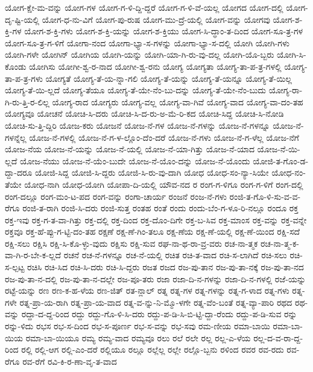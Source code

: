 {ಯೋಗ-ಕ್ಷೇ-ಮ-ವನ್ನು
ಯೋಗ-ಗಳ
ಯೋಗ-ಗ-ಳಿ-ದ್ದಿ-ದ್ದರೆ
ಯೋಗ-ಗ-ಳಿ-ವೆ-ಯಲ್ಲ
ಯೋಗದ
ಯೋಗ-ದಲ್ಲಿ
ಯೋಗ-ದೃ-ಷ್ಟಿ-ಯಲ್ಲಿ
ಯೋಗ-ಧ-ನು-ವಿಗೆ
ಯೋಗ-ಪು-ರುಷ
ಯೋಗ-ಮು-ದ್ರೆ-ಯಲ್ಲಿ
ಯೋಗ-ವನ್ನು
ಯೋಗವು
ಯೋಗ-ಶ-ಕ್ತಿ-ಗಳ
ಯೋಗ-ಶ-ಕ್ತಿ-ಗಳು
ಯೋಗ-ಶ-ಕ್ತಿ-ಯನ್ನು
ಯೋಗ-ಶ-ಕ್ತಿಯು
ಯೋಗ-ಸಿ-ದ್ಧಾಂ-ತ-ದಿಂದ
ಯೋಗ-ಸೂ-ತ್ರ-ಗಳ
ಯೋಗ-ಸೂ-ತ್ರ-ಗ-ಳಿಗೆ
ಯೋಗಾ-ನಂದ
ಯೋಗಾ-ಭ್ಯಾ-ಸ-ಗಳನ್ನು
ಯೋಗಾ-ಭ್ಯಾ-ಸ-ದಲ್ಲಿ
ಯೋಗಿ
ಯೋಗಿ-ಗಳು
ಯೋಗಿ-ಗಳೇ
ಯೋಗಿನ್
ಯೋಗಿಯ
ಯೋಗಿ-ಯನ್ನು
ಯೋಗಿ-ಯಾ-ಗಿ-ರು-ವು-ದಲ್ಲ
ಯೋಗಿ-ಯೊ-ಬ್ಬರು
ಯೋಗಿ-ಸಿ-ಕೊಂಡು
ಯೋಗಿಸು
ಯೋಗೀ-ಶ್ವ-ರ-ನಾದ
ಯೋಗೀ-ಶ್ವ-ರನು
ಯೋಗ್ಯ
ಯೋಗ್ಯತಾ
ಯೋಗ್ಯ-ತಾ-ಪ-ತ್ರ-ಗಳಲ್ಲಿ
ಯೋಗ್ಯ-ತಾ-ಪ-ತ್ರ-ಗಳು
ಯೋಗ್ಯತೆ
ಯೋಗ್ಯ-ತೆ-ಯ-ನ್ನಾ-ಗಲಿ
ಯೋಗ್ಯ-ತೆ-ಯನ್ನು
ಯೋಗ್ಯ-ತೆ-ಯನ್ನೂ
ಯೋಗ್ಯ-ತೆ-ಯಿಲ್ಲ
ಯೋಗ್ಯ-ತೆ-ಯಿ-ಲ್ಲದೆ
ಯೋಗ್ಯ-ತೆಯೂ
ಯೋಗ್ಯ-ತೆ-ಯೇ-ನೆಂ-ಬು-ದನ್ನು
ಯೋಗ್ಯ-ತೆ-ಯೇ-ನೆಂ-ಬುದು
ಯೋಗ್ಯ-ರಾ-ಗಿ-ರು-ತ್ತಿ-ರ-ಲಿಲ್ಲ
ಯೋಗ್ಯ-ರಾದ
ಯೋಗ್ಯರು
ಯೋಗ್ಯ-ವಲ್ಲ
ಯೋಗ್ಯ-ವಾ-ಗಿವೆ
ಯೋಗ್ಯ-ವಾದ
ಯೋಗ್ಯ-ವಾ-ದಂ-ತಹ
ಯೋಗ್ಯವೂ
ಯೋಚನೆ
ಯೋಚಿ-ಸಿ-ದರು
ಯೋಚಿ-ಸಿ-ದ-ರು-ಅ-ಮೆ-ರಿ-ಕದ
ಯೋಚಿ-ಸಿದ್ದ
ಯೋಚಿ-ಸಿ-ನೋಡಿ
ಯೋಚಿ-ಸು-ತ್ತಿ-ದ್ದಿರಿ
ಯೋಜ-ಕರು
ಯೋಜನೆ
ಯೋಜ-ನೆ-ಗಳ
ಯೋಜ-ನೆ-ಗಳನ್ನು
ಯೋಜ-ನೆ-ಗಳನ್ನೂ
ಯೋಜ-ನೆ-ಗಳನ್ನೆಲ್ಲ
ಯೋಜ-ನೆ-ಗಳಲ್ಲಿ
ಯೋಜ-ನೆ-ಗ-ಳ-ಲ್ಲೊಂ-ದೆಂ-ದರೆ
ಯೋಜ-ನೆ-ಗಳು
ಯೋಜ-ನೆ-ಗ-ಳೆಲ್ಲ
ಯೋಜ-ನೆಗೆ
ಯೋಜ-ನೆಯ
ಯೋಜ-ನೆ-ಯನ್ನು
ಯೋಜ-ನೆ-ಯಲ್ಲಿ
ಯೋಜ-ನೆ-ಯಾ-ಗಿತ್ತು
ಯೋಜ-ನೆ-ಯಾದ
ಯೋಜ-ನೆ-ಯಿ-ಲ್ಲದೆ
ಯೋಜ-ನೆಯು
ಯೋಜ-ನೆ-ಯೆಂ-ಬುದೇ
ಯೋಜ-ನೆ-ಯೊಂ-ದನ್ನು
ಯೋಜ-ನೆ-ಯೊಂದು
ಯೋಜಿ-ತ-ಗೊಂ-ಡ-ದ್ದಾ-ದರೂ
ಯೋಜಿ-ಸಿದ್ದ
ಯೋಜಿ-ಸಿ-ದ್ದರು
ಯೋಜಿ-ಸಿ-ರು-ವು-ದಾಗಿ
ಯೋಧ
ಯೋಧ-ಸಂ-ನ್ಯಾ-ಸಿಯೇ
ಯೋಧ-ನಂ-ತೆಯೇ
ಯೋಧ-ನಾಗಿ
ಯೋಧ-ಯೋಗಿ
ಯೋಪಾ-ದಿ-ಯಲ್ಲಿ
ಯೌವ-ನದ
ರ
ರಂಗ-ಗ-ಳಿಗೂ
ರಂಗ-ಗ-ಳಿಗೆ
ರಂಗ-ದಲ್ಲಿ
ರಂಗ-ದಲ್ಲೂ
ರಂಗ-ಮಂ-ಟ-ಪದ
ರಂಗ-ವನ್ನು
ರಂಗಾ-ಚಾರ್ಯ
ರಂಜನೆ
ರಂಜ-ನೆ-ಗಳು
ರಂಜಿ-ತ-ಗೊ-ಳಿ-ಸು-ವ-ವ-ರೆಗೂ
ರಂಜಿ-ತ-ರಾಗಿ
ರಂಜಿ-ಸಿ-ದರು
ರಂಜಿ-ಸುತ್ತ
ರಂತಹ
ರಂತೆ
ರಂದು
ರಂದು-ಬೆಂ-ಗ-ಳೂ-ರಿ-ನಲ್ಲೂ
ರಂದೂ
ರಕ್ತ
ರಕ್ತ-ಇವು
ರಕ್ತ-ಗ-ತ-ವಾ-ಗಿತ್ತು
ರಕ್ತ-ದಲ್ಲಿ
ರಕ್ತ-ದಿಂದ
ರಕ್ತ-ದೊಂ-ದಿಗೇ
ರಕ್ತ-ಬ-ಸಿವ
ರಕ್ತ-ಮಾಂಸ
ರಕ್ತ-ವನ್ನು
ರಕ್ತ-ವನ್ನೇ
ರಕ್ತವೂ
ರಕ್ತ-ಹೆ-ಪ್ಪು-ಗ-ಟ್ಟಿ-ದಂ-ತಹ
ರಕ್ಷಣೆ
ರಕ್ಷ-ಣೆ-ಗಿಂ-ತಲೂ
ರಕ್ಷ-ಣೆಯ
ರಕ್ಷ-ಣೆ-ಯಲ್ಲಿ
ರಕ್ಷ-ಣೆ-ಯಿಂದ
ರಕ್ಷಿ-ಸದೆ
ರಕ್ಷಿ-ಸಲು
ರಕ್ಷಿಸಿ
ರಕ್ಷಿ-ಸಿ-ಕೊ-ಳ್ಳು-ವುದು
ರಕ್ಷಿಸು
ರಕ್ಷಿ-ಸುವ
ರಘ-ನಾ-ಥ-ರಾ-ವ್ರ-ವರು
ರಚ-ನಾ-ತ್ಮಕ
ರಚ-ನಾ-ತ್ಮ-ಕ-ವಾ-ಗಿ-ರ-ಬೇ-ಕ-ಲ್ಲದೆ
ರಚನೆ
ರಚ-ನೆ-ಗಳನ್ನೂ
ರಚ-ನೆ-ಯಲ್ಲಿ
ರಚಿತ
ರಚಿ-ತ-ವಾದ
ರಚಿ-ಸ-ಲಾಗಿದೆ
ರಚಿ-ಸಲು
ರಚಿ-ಸ-ಲ್ಪಟ್ಟ
ರಚಿಸಿ
ರಚಿ-ಸಿದ
ರಚಿ-ಸಿ-ದರು
ರಚಿ-ಸಿ-ದ್ದರು
ರಜತ
ರಜದ
ರಜ-ಪು-ತಾನ
ರಜ-ಪು-ತಾ-ನಕ್ಕೆ
ರಜ-ಪು-ತಾ-ನದ
ರಜ-ಪು-ತಾ-ನ-ದಲ್ಲಿ
ರಜ-ಪು-ತಾ-ನ-ದಲ್ಲೇ
ರಜ-ಪೂ-ತರು
ರಜಾ
ರಜಾ-ದಿ-ನ-ಗಳನ್ನು
ರಜಾ-ದಿ-ನ-ಗಳಲ್ಲಿ
ರಜೆ-ಯನ್ನು
ರಟ್ಟೆ-ಯನ್ನು
ರಣ
ರಣ-ಕ-ಹ-ಳೆಯ
ರಣ-ಜಿತ್
ರತ-ನ್ಲಾಲ್
ರತ್ನ
ರತ್ನ-ಗಳ
ರತ್ನ-ಗಳನ್ನು
ರತ್ನ-ಗ-ಳಾದ
ರತ್ನ-ಗಳು
ರತ್ನ-ಗಳೇ
ರತ್ನ-ಪ್ರಾ-ಯ-ರಾಗಿ
ರತ್ನ-ಪ್ರಾ-ಯ-ವಾದ
ರತ್ನ-ವ-ನ್ನು-ನಿ-ಮ್ಮೊ-ಳಗೇ
ರತ್ನ-ವೆಂ-ಬಂತೆ
ರತ್ನ-ವ್ಯಾ-ಪಾರಿ
ರಥದ
ರಥ-ವನ್ನು
ರದ್ದಾ-ದ-ದ್ದ-ರಿಂದ
ರದ್ದು
ರದ್ದು-ಗೊ-ಳಿ-ಸಿ-ದರು
ರದ್ದು-ಪ-ಡಿ-ಸಿ-ಬಿ-ಟ್ಟಿ-ದ್ದಾ-ರೆಂದು
ರದ್ದು-ಪ-ಡಿ-ಸುವ
ರನ್ನು
ರನ್ನು-ಳಿದು
ರಭಸ
ರಭ-ಸ-ದಿಂದ
ರಭ-ಸ-ಪೂರ್ಣ
ರಭ-ಸ-ವನ್ನು
ರಭ-ಸವು
ರಮ-ಣೀಯ
ರಮಾ-ಬಾಯಿ
ರಮಾ-ಬಾ-ಯಿಯ
ರಮಾ-ಬಾ-ಯಿಯೂ
ರಮ್ಯ
ರಮ್ಯ-ವಾದ
ರಮ್ಯವೂ
ರಲು
ರಲೆ
ರಲೇ
ರಲ್ಲ
ರಲ್ಲ-ಎ-ಳೆಯ
ರಲ್ಲ-ದ-ವ-ರಾ-ದ್ದ-ರಿಂದ
ರಲ್ಲಿ
ರಲ್ಲಿ-ಆಗ
ರಲ್ಲಿ-ಎಂ-ದರೆ
ರಲ್ಲಿಯೂ
ರಲ್ಲೂ
ರಲ್ಲೆಲ್ಲ
ರಲ್ಲೇ
ರಲ್ಲೊ-ಬ್ಬನು
ರಳಿಂದ
ರವರ
ರವ-ರದು
ರವ-ರೆಗೂ
ರವ-ರೆಗೆ
ರವಿ-ಕಿ-ರ-ಣಾ-ವೃ-ತ-ವಾದ
}
